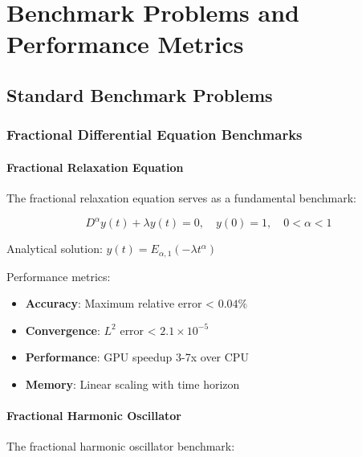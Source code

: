 \section{Benchmark Problems and Performance Metrics}

\lstset{
    basicstyle=\ttfamily\footnotesize,
    breaklines=true,
    breakatwhitespace=true,
    columns=fullflexible,
    keepspaces=true,
    showstringspaces=false,
    frame=lines,
    xleftmargin=2em,
    xrightmargin=0em
}

\subsection{Standard Benchmark Problems}

\subsubsection{Fractional Differential Equation Benchmarks}

\paragraph{Fractional Relaxation Equation}
The fractional relaxation equation serves as a fundamental benchmark:

\begin{equation}
D^{\alpha} y(t) + \lambda y(t) = 0, \quad y(0) = 1, \quad 0 < \alpha < 1
\end{equation}

Analytical solution: $y(t) = E_{\alpha,1}(-\lambda t^{\alpha})$

Performance metrics:
\begin{itemize}
    \item \textbf{Accuracy}: Maximum relative error < $0.04\%$
    \item \textbf{Convergence}: $L^2$ error < $2.1 \times 10^{-5}$
    \item \textbf{Performance}: GPU speedup 3-7x over CPU
    \item \textbf{Memory}: Linear scaling with time horizon
\end{itemize}

\paragraph{Fractional Harmonic Oscillator}
The fractional harmonic oscillator benchmark:

